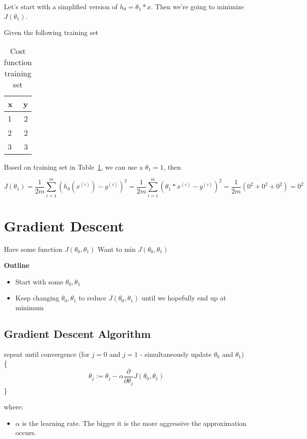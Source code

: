 \documentclass[a4paper]{article}
\begin{document}
Let's start with a simplified version of $h_\theta = \theta_1 * x$. Then we're going to minimize $J(\theta_1)$.

Given the following training set\:

\begin{table}[]
\centering
\begin{tabular}{l|r}
\textbf{x} & \textbf{y} \\\hline
1     & 2 \\
2     & 2 \\
3     & 3
\end{tabular}
\caption{Cost function training set}
\label{tab:cost-function-training-set}
\end{table}

Based on training set in Table~\ref{tab:cost-function-training-set}, we can use a $\theta_1 = 1$, then\:

$$
J(\theta_1) = \frac{1}{2m}\sum_{i=1}^{m}(h_\theta(x^{(i)}) - y^{(i)})^2
= \frac{1}{2m}\sum_{i=1}^{m}(\theta_1 * x^{(i)} - y^{(i)})^2 = \frac{1}{2m}(0^2 + 0^2 + 0^2) = 0^2$$

\section{Gradient Descent}

Have some function $J(\theta_0,\theta_1)$
Want to min $J(\theta_0,\theta_1)$

\textbf{Outline}
\begin{itemize}
\item Start with some $\theta_0, \theta_1$
\item Keep changing $\theta_0, \theta_1$ to reduce $J(\theta_0,\theta_1)$ until we hopefully end up at minimum
\end{itemize}

\subsection{Gradient Descent Algorithm}

repeat until convergence (for $j=0$ and $j=1$ - simultaneously update $\theta_0$ and $\theta_1$) \{
$$
\theta_j := \theta_j - \alpha \frac{\partial}{\partial \theta_j}J(\theta_0, \theta_1)
$$
\}

\medskip

where:

\begin{itemize}
\item $\alpha$\: is the learning rate. The bigger it is the more aggressive the approximation occurs.
\end{itemize}
\end{document}
